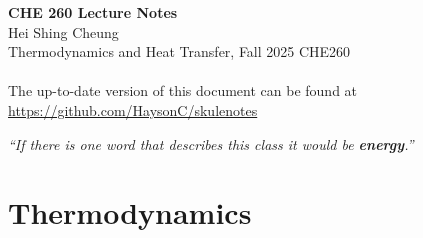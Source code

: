 \documentclass[11pt]{report}
\begin{document}
\thispagestyle{empty}
{\LARGE \bf CHE 260 Lecture Notes}\\
{\large Hei Shing Cheung}\\
Thermodynamics and Heat Transfer, Fall 2025 \hfill CHE260\\
\\
The up-to-date version of this document can be found at \url{https://github.com/HaysonC/skulenotes}\\

\begin{center}
    \textit{``If there is one word that describes this class it would be \textbf{energy}.''}
\end{center}
\chapter{Thermodynamics}
\end{document}
